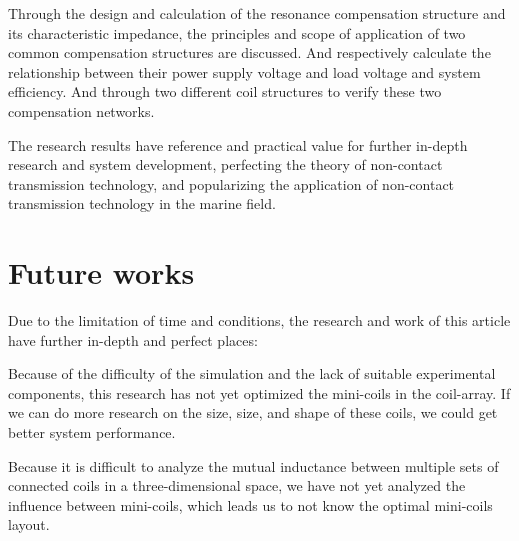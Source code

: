 Through the design and calculation of the resonance compensation structure and its characteristic impedance, the principles and scope of application of two common compensation structures are discussed.
And respectively calculate the relationship between their power supply voltage and load voltage and system efficiency.
And through two different coil structures to verify these two compensation networks.

The research results have reference and practical value for further in-depth research and system development, perfecting the theory of non-contact transmission technology, and popularizing the application of non-contact transmission technology in the marine field.

\section{Future works}
Due to the limitation of time and conditions, the research and work of this article have further in-depth and perfect places:

Because of the difficulty of the simulation and the lack of suitable experimental components, this research has not yet optimized the mini-coils in the coil-array. If we can do more research on the size, size, and shape of these coils, we could get better system performance.

Because it is difficult to analyze the mutual inductance between multiple sets of connected coils in a three-dimensional space, we have not yet analyzed the influence between mini-coils, which leads us to not know the optimal mini-coils layout.



